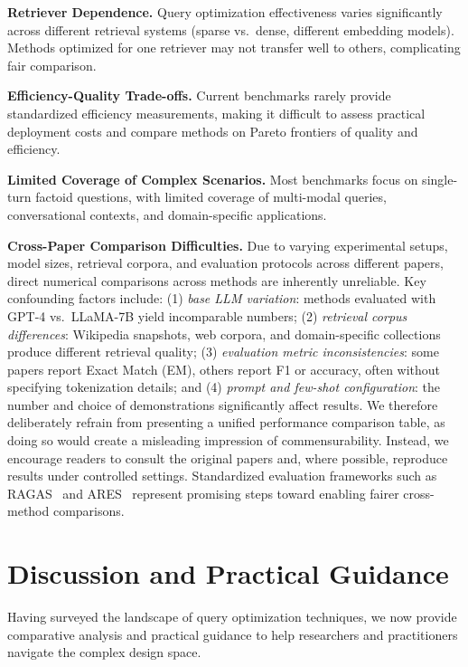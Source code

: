 \documentclass{article}
\begin{document}
\textbf{Retriever Dependence.} Query optimization effectiveness varies significantly across different retrieval systems (sparse vs.\ dense, different embedding models). Methods optimized for one retriever may not transfer well to others, complicating fair comparison.

\textbf{Efficiency-Quality Trade-offs.} Current benchmarks rarely provide standardized efficiency measurements, making it difficult to assess practical deployment costs and compare methods on Pareto frontiers of quality and efficiency.

\textbf{Limited Coverage of Complex Scenarios.} Most benchmarks focus on single-turn factoid questions, with limited coverage of multi-modal queries, conversational contexts, and domain-specific applications.

\textbf{Cross-Paper Comparison Difficulties.} Due to varying experimental setups, model sizes, retrieval corpora, and evaluation protocols across different papers, direct numerical comparisons across methods are inherently unreliable. Key confounding factors include: (1) \textit{base LLM variation}: methods evaluated with GPT-4 vs.\ LLaMA-7B yield incomparable numbers; (2) \textit{retrieval corpus differences}: Wikipedia snapshots, web corpora, and domain-specific collections produce different retrieval quality; (3) \textit{evaluation metric inconsistencies}: some papers report Exact Match (EM), others report F1 or accuracy, often without specifying tokenization details; and (4) \textit{prompt and few-shot configuration}: the number and choice of demonstrations significantly affect results. We therefore deliberately refrain from presenting a unified performance comparison table, as doing so would create a misleading impression of commensurability. Instead, we encourage readers to consult the original papers and, where possible, reproduce results under controlled settings. Standardized evaluation frameworks such as RAGAS~\citep{RAGAS} and ARES~\citep{ARES} represent promising steps toward enabling fairer cross-method comparisons.

\section{Discussion and Practical Guidance}\label{sec:discussion}

Having surveyed the landscape of query optimization techniques, we now provide comparative analysis and practical guidance to help researchers and practitioners navigate the complex design space.
\end{document}
